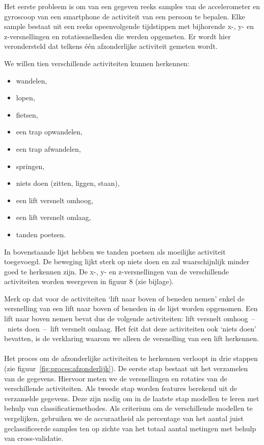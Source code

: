 \documentclass{article}
\begin{document}
Het eerste probleem is om van een gegeven reeks samples van de accelerometer en gyroscoop van een smartphone de activiteit van een persoon te bepalen. Elke sample bestaat uit een reeks opeenvolgende tijdstippen met bijhorende x-, y- en z-versnellingen en rotatiesnelheden die werden opgemeten. Er wordt hier verondersteld dat telkens \'e\'en afzonderlijke activiteit gemeten wordt.

We willen tien verschillende activiteiten kunnen herkennen:
\begin{itemize}
\item wandelen,
\item lopen,
\item fietsen,
\item een trap opwandelen,
\item een trap afwandelen,
\item springen,
\item niets doen (zitten, liggen, staan),
\item een lift versnelt omhoog,
\item een lift versnelt omlaag,
\item tanden poetsen.
\end{itemize}

In bovenstaande lijst hebben we tanden poetsen als moeilijke activiteit toegevoegd. De beweging lijkt sterk op niets doen en zal waarschijnlijk minder goed te herkennen zijn. De x-, y- en z-versnellingen van de verschillende activiteiten worden weergeven in figuur 8 (zie bijlage).

Merk op dat voor de activiteiten `lift naar boven of beneden nemen' enkel de versnelling van een lift naar boven of beneden in de lijst worden opgenomen. Een lift naar boven nemen bevat dus de volgende activiteiten: lift versnelt omhoog~--~niets doen~--~lift versnelt omlaag. Het feit dat deze activiteiten ook `niets doen' bevatten, is de verklaring waarom we alleen de versnelling van een lift herkennen.
\\~\\
Het proces om de afzonderlijke activiteiten te herkennen verloopt in drie stappen (zie figuur~\ref{fig:proces:afzonderlijk}). De eerste stap bestaat uit het verzamelen van de gegevens. Hiervoor meten we de versnellingen en rotaties van de verschillende activiteiten. Als tweede stap worden features berekend uit de verzamelde gegevens. Deze zijn nodig om in de laatste stap modellen te leren met behulp van classificatiemethodes. Als criterium om de verschillende modellen te vergelijken, gebruiken we de accuraatheid als percentage van het aantal juist geclassificeerde samples ten op zichte van het totaal aantal metingen met behulp van cross-validatie.
\end{document}

